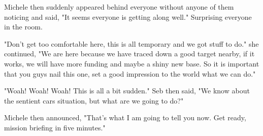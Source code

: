 Michele then suddenly appeared behind everyone without anyone of them noticing and said, "It seems everyone is getting along well."
Surprising everyone in the room. 

"Don't get too comfortable here, this is all temporary and we got stuff to do." she continued, 
"We are here because we have traced down a good target nearby, if it works, we will have more funding and maybe a shiny new base. So it is important that you guys nail this one, set a good impression to the world what we can do."

"Woah! Woah! Woah! This is all a bit sudden." Seb then said, "We know about the sentient cars situation, but what are we going to do?"

Michele then announced, "That's what I am going to tell you now. Get ready, mission briefing in five minutes."
